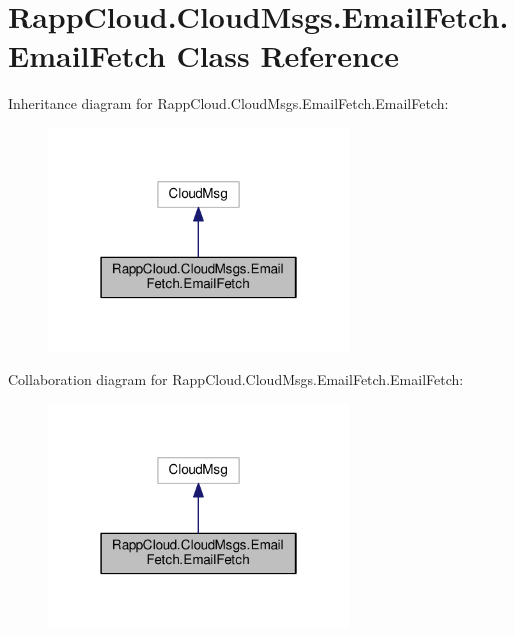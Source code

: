 \hypertarget{classRappCloud_1_1CloudMsgs_1_1EmailFetch_1_1EmailFetch}{\section{Rapp\-Cloud.\-Cloud\-Msgs.\-Email\-Fetch.\-Email\-Fetch Class Reference}
\label{classRappCloud_1_1CloudMsgs_1_1EmailFetch_1_1EmailFetch}
}


Inheritance diagram for Rapp\-Cloud.\-Cloud\-Msgs.\-Email\-Fetch.\-Email\-Fetch\-:
\nopagebreak
\begin{figure}[H]
\begin{center}
\leavevmode
\includegraphics[width=226pt]{classRappCloud_1_1CloudMsgs_1_1EmailFetch_1_1EmailFetch__inherit__graph}
\end{center}
\end{figure}


Collaboration diagram for Rapp\-Cloud.\-Cloud\-Msgs.\-Email\-Fetch.\-Email\-Fetch\-:
\nopagebreak
\begin{figure}[H]
\begin{center}
\leavevmode
\includegraphics[width=226pt]{classRappCloud_1_1CloudMsgs_1_1EmailFetch_1_1EmailFetch__coll__graph}
\end{center}
\end{figure}

